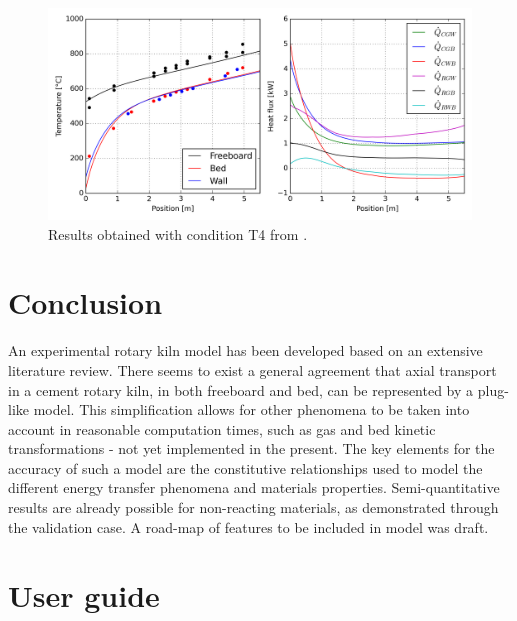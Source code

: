 \documentclass[11pt]{paper}
\newif\ifnotdraft
\begin{document}
\begin{figure}[!ht]
\centering
\includegraphics[width=0.95\linewidth]{media/validation-barr}
\caption{\label{fig:validation-barr}Results obtained with condition T4 from \textcite{Barr1986PhD}.}
\end{figure}

\ifnotdraft
\section{Results}
\fi

\section*{Conclusion}

An experimental rotary kiln model has been developed based on an extensive literature review. There seems to exist a general agreement that axial transport in a cement rotary kiln, in both freeboard and bed, can be represented by a plug-like model. This simplification allows for other phenomena to be taken into account in reasonable computation times, such as gas and bed kinetic transformations - not yet implemented in the present. The key elements for the accuracy of such a model are the constitutive relationships used to model the different energy transfer phenomena and materials properties. Semi-quantitative results are already possible for non-reacting materials, as demonstrated through the validation case. A road-map of features to be included in model was draft.

\clearpage%
\printbibliography%
\clearpage%
\listoftables%
\listoffigures%

\ifnotdraft%
\printunsrtglossary[type=symbols,style=long]%
\fi%

\clearpage%

\appendix%
\section{User guide}
\end{document}
